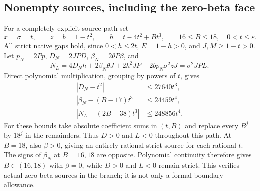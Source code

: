 \documentclass[11pt]{article}
\newcommand{\eps}{\varepsilon}
\begin{document}
\subsection*{Nonempty sources, including the zero-beta face}
For a completely explicit source path set
\[
 x=\sigma=t,\qquad z=b=1-t^2,\qquad
 h=t-4t^2+Bt^3,\qquad 16\le B\le18,\quad0<t\le\eps.
\]
All strict native gaps hold, since $0<h\le2t$, $E=1-h>0$,
and $J,M\ge1-t>0$. Let $p_N=2Pp$, $D_N=2JPD$,
$\beta_N=2\theta P\beta$, and
\[
 N_L=4D_Nh+2\beta_N\theta J+2h^2JP
                              -2bp_N\sigma^2zJ=\sigma^2JP L.
\]
Direct polynomial multiplication, grouping by powers of $t$, gives
\[
\begin{split}
 |D_N-t^2|&\le27640t^3,\\
 |\beta_N-(B-17)t^3|&\le24459t^4,\\
 |N_L-(2B-38)t^3|&\le248856t^4.
\end{split}
\]
For these bounds take absolute coefficient sums in $(t,B)$ and
replace every $B^j$ by $18^j$ in the remainders. Thus $D>0$ and
$L<0$ throughout this path. At $B=18$, also $\beta>0$, giving
an entirely rational strict source for each rational $t$.
The signs of $\beta_N$ at $B=16,18$ are opposite. Polynomial
continuity therefore gives $B\in(16,18)$ with $\beta=0$, while
$D>0$ and $L<0$ remain strict. This verifies actual zero-beta
sources in the branch; it is not only a formal boundary allowance.
\end{document}
